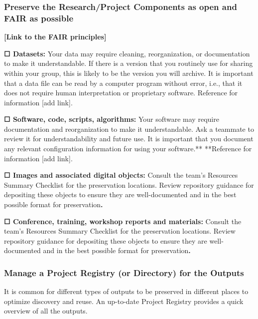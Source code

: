\documentclass[
  letterpaper,
  DIV=11,
  numbers=noendperiod]{scrreport}
\begin{document}
\hypertarget{preserve-the-researchproject-components-as-open-and-fair-as-possible}{%
\subsubsection{Preserve the Research/Project Components as open and FAIR
as
possible}\label{preserve-the-researchproject-components-as-open-and-fair-as-possible}}

\textbf{{[}Link to the FAIR principles{]}}

\textbf{☐ Datasets: } Your data may require cleaning, reorganization, or
documentation to make it understandable. If there is a version that you
routinely use for sharing within your group, this is likely to be the
version you will archive. It is important that a data file can be read
by a computer program without error, i.e., that it does not require
human interpretation or proprietary software. Reference for information
{[}add link{]}.

\textbf{☐ Software, code, scripts, algorithms:} Your software may
require documentation and reorganization to make it understandable. Ask
a teammate to review it for understandability and future use. It is
important that you document any relevant configuration information for
using your software.** **Reference for information {[}add link{]}.

\textbf{☐ Images and associated digital objects: }Consult the team's
Resources Summary Checklist for the preservation locations. Review
repository guidance for depositing these objects to ensure they are
well-documented and in the best possible format for
preservation\textbf{. }

\textbf{☐ Conference, training, workshop reports and materials:} Consult
the team's Resources Summary Checklist for the preservation locations.
Review repository guidance for depositing these objects to ensure they
are well-documented and in the best possible format for
preservation\textbf{. }

\hypertarget{manage-a-project-registry-or-directory-for-the-outputs}{%
\subsubsection{Manage a Project Registry (or Directory) for the
Outputs}\label{manage-a-project-registry-or-directory-for-the-outputs}}

It is common for different types of outputs to be preserved in different
places to optimize discovery and reuse. An up-to-date Project Registry
provides a quick overview of all the outputs.
\end{document}
